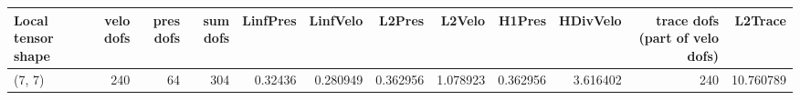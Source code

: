 \begin{tabular}{lrrrrrrrrrrr}
\toprule
Local tensor shape &  velo dofs &  pres dofs &  sum dofs &  LinfPres &  LinfVelo &   L2Pres &   L2Velo &   H1Pres &  HDivVelo &  trace dofs (part of velo dofs) &   L2Trace \\
\midrule
            (7, 7) &        240 &         64 &       304 &   0.32436 &  0.280949 & 0.362956 & 1.078923 & 0.362956 &  3.616402 &                             240 & 10.760789 \\
\bottomrule
\end{tabular}
